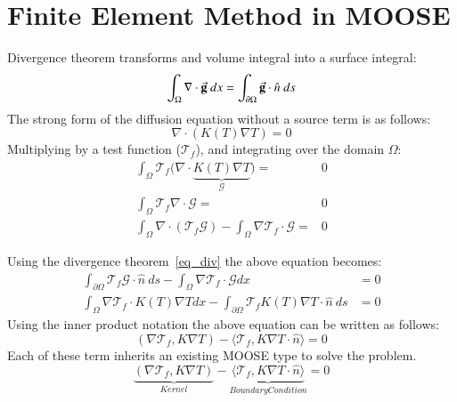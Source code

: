 \chapter{Finite Element Method in MOOSE}\label{appen_fem}
Divergence theorem transforms and volume integral into a surface integral:
	\begin{equation}\label{eq_div}
		\int_{\Omega} \nabla \cdot \va{g}\ dx = \int_{\partial \Omega} \va{g} \cdot \hat{n}\ ds
	\end{equation}
The strong form of the diffusion equation without a source term is as follows:
\begin{equation*}
	\nabla \cdot \left(K(T)\nabla T\right) = 0
\end{equation*}
Multiplying by a test function ($\mathcal{T}_f$), and integrating over the domain $\Omega$:
    \begin{align*}
		\int_{\Omega} \mathcal{T}_f \big( \nabla \cdot \underbrace{K(T) \nabla T}_{\mathcal{G}} \big) = &  0 \\
		\int_{\Omega} \mathcal{T}_f \nabla \cdot \mathcal{G} = & 0 \\
		\int_{\Omega} \nabla \cdot (\mathcal{T}_f \mathcal{G}) - \int_{\Omega} \nabla \mathcal{T}_f \cdot \mathcal{G} = & 0
	\end{align*}

Using the divergence theorem~\eqref{eq_div} the above equation becomes:
	\begin{align*}
		\int_{\partial \Omega} \mathcal{T}_f \mathcal{G} \cdot \hat{n}\  ds - \int_{\Omega} \nabla \mathcal{T}_f \cdot \mathcal{G} dx  &=  0 \\
		\int_{\Omega} \nabla \mathcal{T}_f \cdot K(T) \nabla T dx - \int_{\partial \Omega} \mathcal{T}_f K(T)\nabla T \cdot \hat{n}\  ds   &= 0
	\end{align*}
Using the inner product notation the above equation can be written as follows:
\begin{equation}
	(\nabla \mathcal{T}_f, K\nabla T) - \langle \mathcal{T}_f, K\nabla T \cdot \hat{n}  \rangle = 0
\end{equation}
Each of these term inherits an existing MOOSE type to solve the problem.
\begin{equation}
	\underbrace{(\nabla \mathcal{T}_f, K\nabla T)}_{Kernel} - \underbrace{\langle \mathcal{T}_f, K\nabla T \cdot \hat{n}  \rangle}_{Boundary Condition} = 0
\end{equation}

